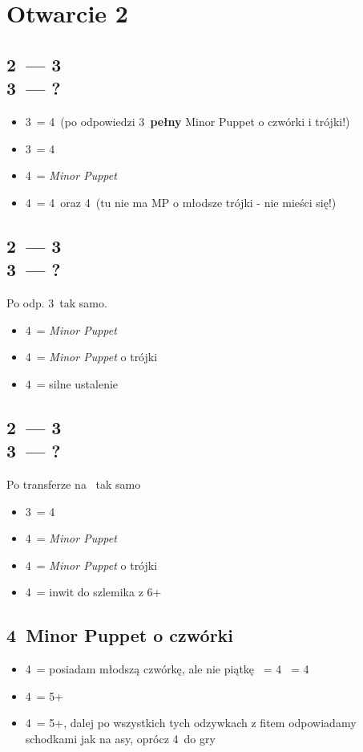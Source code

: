 \documentclass[12pt, a4paper]{article}
\begin{document}
\pagebreak
\section{Otwarcie 2\ntx}
\subsection*{2\ntx\ --- 3\clubs \\ 3\diams\ --- ?}
\begin{itemize}
    \item 3\hearts\ = 4\spades\ (po odpowiedzi 3\nt\ \textbf{pełny} Minor Puppet o czwórki i trójki!)
    \item 3\spades\ = 4\hearts
    \item 4\clubs\ = \emph{Minor Puppet}
    \item 4\diams\ = 4\hearts\ oraz 4\spades\ (tu nie ma MP o młodsze trójki - nie mieści się!)
\end{itemize}

\subsection*{2\ntx\ --- 3\clubs \\ 3\spades\ --- ?}
Po odp. 3\hearts\ tak samo.
\begin{itemize}
    \item 4\clubs\ = \emph{Minor Puppet}
    \item 4\diams\ = \emph{Minor Puppet} o trójki
    \item 4\hearts\ = silne ustalenie \spades
\end{itemize}

\subsection*{2\ntx\ --- 3\diams \\ 3\hearts\ --- ?}
Po transferze na \spades\ tak samo
\begin{itemize}
    \item 3\spades\ = 4\hearts
    \item 4\clubs\ = \emph{Minor Puppet}
    \item 4\diams\ = \emph{Minor Puppet} o trójki
    \item 4\hearts\ = inwit do szlemika z 6+\hearts
\end{itemize}

\subsection*{4\clubs\ Minor Puppet o czwórki}
\begin{itemize}
    \item 4\diams\ = posiadam młodszą czwórkę, ale nie piątkę
    \hearts\ = 4\clubs
    \spades\ = 4\diams
    \item 4\hearts\ = 5+\clubs
    \item 4\spades\ = 5+\diams, dalej po wszystkich tych odzywkach z fitem odpowiadamy schodkami jak na asy, oprócz 4\nt\ do gry
\end{itemize}
\end{document}
